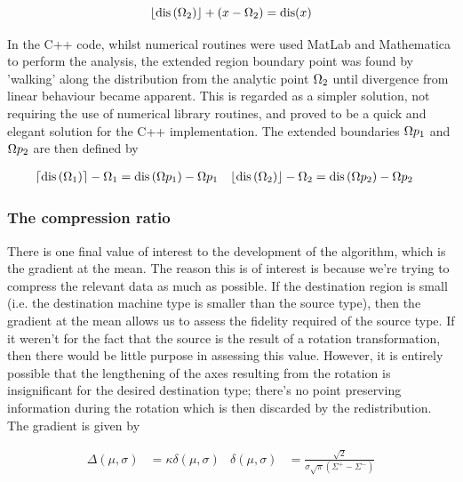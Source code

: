 \begin{equation}
\left\lfloor\text{dis}\left(\Omega _2\right)\right\rfloor+\left(x-\Omega _2\right)=\text{dis}(x)
\end{equation}

In the C++ code, whilst numerical routines were used  MatLab and Mathematica to perform the analysis, the extended region boundary point was found by 'walking' along the distribution from the analytic point $\Omega_2$  until divergence from linear behaviour became apparent. This is regarded as a simpler solution, not requiring the use of numerical library routines, and proved to be a quick and elegant solution for the C++ implementation. The extended boundaries $\Omega p_1$ and $\Omega p_2$ are then defined by

\begin{equation}
\begin{aligned}
\left\lceil\text{dis}\left(\Omega _1\right)\right\rceil-\Omega _1 & =\text{dis}\left(\Omega p _1\right)- \Omega p _1 &
\left\lfloor\text{dis}\left(\Omega _2\right)\right\rfloor-\Omega _2 & =\text{dis}\left(\Omega p _2\right)- \Omega p _2 
\end{aligned}
\end{equation}

\subsubsection{The compression ratio}

There is one final value of interest to the development of the algorithm, which is the gradient at the mean. The reason this is of interest is because we're trying to compress the relevant data as much as possible. If the destination region is small (i.e. the destination machine type is smaller than the source type), then the gradient at the mean allows us to assess the fidelity required of the source type. If it weren't for the fact that the source is the result of a rotation transformation, then there would be little purpose in assessing this value. However, it is entirely possible that the lengthening of the axes resulting from the rotation is insignificant for the desired destination type; there's no point preserving information during the rotation which is then discarded by the redistribution. The gradient is given by

\begin{equation}\label{eq:gradient}
\begin{aligned}
\Delta(\mu,\sigma) &= \kappa  \delta(\mu,\sigma)  & \delta(\mu,\sigma)  &= \frac{ \sqrt{2} }{ \sigma \sqrt{\pi }  \left(\Sigma^+-\Sigma^-\right)}
\end{aligned}
\end{equation}

